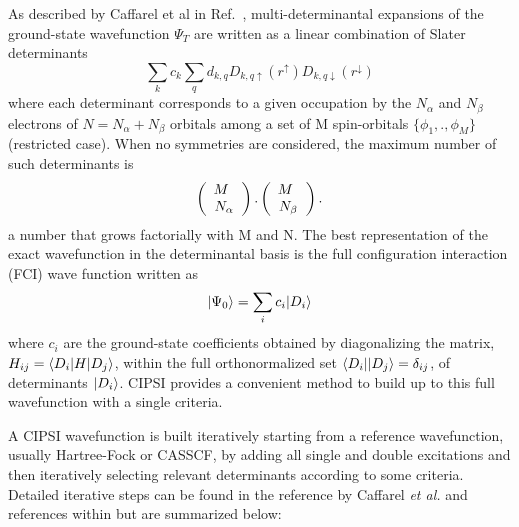 As described by Caffarel et al in Ref.~\cite{Caffarel2013},
multi-determinantal expansions of the ground-state wavefunction
$\Psi_T$ are written as a linear combination of Slater determinants
\begin{equation}
\sum_k c_k \sum_q d_{k,q}D_{k,q\uparrow } (r^{\uparrow})D_{k,q\downarrow}(r^{\downarrow}) %
\end{equation}
  where each determinant corresponds to a given occupation by the $N_{\alpha}$ and $N_{\beta}$ electrons of $N=N_{\alpha}+N_{\beta}$ orbitals among a set of M spin-orbitals $\{\phi_1,.,\phi_M\}$ (restricted case). When no symmetries are
considered, the maximum number of such determinants is
\begin{eqnarray}
\label{eqn:Det-Permutations}
\left(
\begin{array}{c} M \hspace{1.5mm} \\ N_{\alpha}  \end{array}
\right).
\left(
\begin{array}{c} M \hspace{1.5mm} \\ N_{\beta}  \end{array}
\right).
\end{eqnarray}
a number that grows factorially with M and N. The best representation of the exact wavefunction in the determinantal basis is the full configuration interaction (FCI) wave function written as 
\begin{equation}
\lvert \Psi_0 \rangle=\sum_{i} c_{i} \lvert D_i \rangle
\end{equation}
where $c_i$ are the ground-state coefficients obtained by
diagonalizing the matrix, $H_{ij}=\langle D_i \rvert H\lvert D_j \rangle$, within the
full orthonormalized set $\langle D_i \rvert\lvert D_j \rangle=\delta_{ij}$, of
determinants $\lvert D_i \rangle$. CIPSI provides a convenient method to build up to this full wavefunction with a single criteria.


A CIPSI wavefunction is built iteratively starting from a reference
wavefunction, usually Hartree-Fock or CASSCF, by adding all single and
double excitations and then iteratively selecting relevant
determinants according to some criteria. Detailed iterative steps can
be found in the reference by Caffarel \textit{et al.} and references
within\cite{Caffarel2013, Scemama2016,Scemama2018,Garniron2017-2} but
are summarized below:

